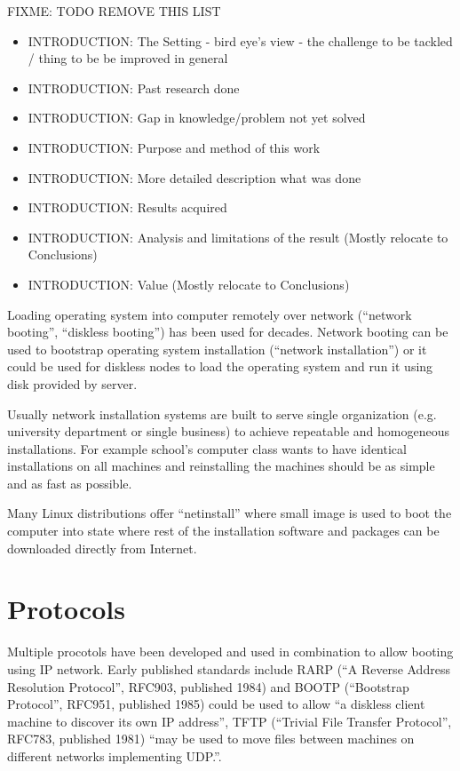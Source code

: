 
FIXME: TODO REMOVE THIS LIST
\begin{itemize}
\item INTRODUCTION: The Setting - bird eye's view - the challenge to be tackled / thing to be be improved in general
\item INTRODUCTION: Past research done
\item INTRODUCTION: Gap in knowledge/problem not yet solved
\item INTRODUCTION: Purpose and method of this work
\item INTRODUCTION: More detailed description what was done
\item INTRODUCTION: Results acquired
\item INTRODUCTION: Analysis and limitations of the result (Mostly relocate to Conclusions)
\item INTRODUCTION: Value (Mostly relocate to Conclusions)
\end{itemize}



Loading operating system into computer remotely over network
(``network booting'', ``diskless booting'') has been used for
decades. Network booting can be used to bootstrap operating system
installation (``network installation'') or it could be used for
diskless nodes to load the operating system and run it using disk
provided by server.

Usually network installation systems are built to serve single
organization (e.g. university department or single business) to
achieve repeatable and homogeneous installations. For example school's
computer class wants to have identical installations on all machines
and reinstalling the machines should be as simple and as fast as
possible.

Many Linux distributions offer ``netinstall'' where small image is
used to boot the computer into state where rest of the installation
software and packages can be downloaded directly from Internet.

\section{Protocols}

Multiple procotols have been developed and used in combination to
allow booting using IP network. Early published standards include RARP
(``A Reverse Address Resolution Protocol'', RFC903, published
1984\cite{RFC903}) and BOOTP (``Bootstrap Protocol'', RFC951, published
1985\cite{RFC951}) could be used to allow ``a diskless client machine
to discover its own IP address''\cite{RFC951}, TFTP (``Trivial File
Transfer Protocol'', RFC783, published 1981\cite{RFC783}) ``may be
used to move files between machines on different networks implementing
UDP.''\cite{RFC783}.

